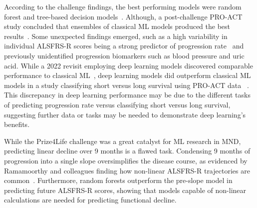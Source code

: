 According to the challenge findings, the best performing models were random forest and tree-based decision models~\cite{kuffnerCrowdsourcedAnalysisClinical2015}.
Although, a post-challenge PRO-ACT study concluded that ensembles of classical ML models produced the best results~\cite{turabiehMachineLearningEmpowered2024}.
Some unexpected findings emerged, such as a high variability in individual ALSFRS-R scores being a strong predictor of progression rate~\cite{hothornRandomForest4LifeRandomForest2014} and previously unidentified progression biomarkers such as blood pressure and uric acid.
While a 2022 revisit employing deep learning models discovered comparable performance to classical ML~\cite{pancottiDeepLearningMethods2022}, deep learning models did outperform classical ML models in a study classifying short versus long survival using PRO-ACT data~\cite{papaizEnsembleimbalancebasedClassificationAmyotrophic2024} .
This discrepancy in deep learning performance may be due to the different tasks of predicting progression rate versus classifying short versus long survival, suggesting further data or tasks may be needed to demonstrate deep learning's benefits.

While the Prize4Life challenge was a great catalyst for ML research in MND, predicting linear decline over 9 months is a flawed task.
Condensing 9 months of progression into a single slope oversimplifies the disease course, as evidenced by Ramamoorthy and colleagues finding how non-linear ALSFRS-R trajectories are common~\cite{ramamoorthyIdentifyingPatternsAmyotrophic2022}.
Furthermore, random forests outperform the pre-slope model in predicting future ALSFRS-R scores, showing that models capable of non-linear calculations are needed for predicting functional decline.

